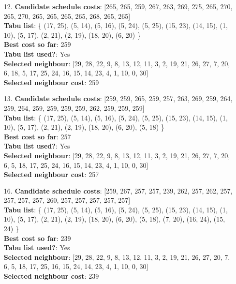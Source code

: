 \documentclass[fleqn]{article}
\begin{document}
\begin{itemize}
    \item[12.] \textbf{Candidate schedule costs}: [265, 265, 259, 267, 263, 269, 275, 265, 270, 265, 270, 265, 265, 265, 265, 268, 265, 265] \\
    \textbf{Tabu list}: \{ (17, 25), (5, 14), (5, 16), (5, 24), (5, 25), (15, 23), (14, 15), (1, 10), (5, 17), (2, 21), (2, 19), (18, 20), (6, 20) \} \\
    \textbf{Best cost so far}: 259 \\
    \textbf{Tabu list used?}: Yes \\
    \textbf{Selected neighbour}: [29, 28, 22, 9, 8, 13, 12, 11, 3, 2, 19, 21, 26, 27, 7, 20, 6, 18, 5, 17, 25, 24, 16, 15, 14, 23, 4, 1, 10, 0, 30] \\
    \textbf{Selected neighbour cost}: 259
      

    \item[13.] \textbf{Candidate schedule costs}: [259, 259, 265, 259, 257, 263, 269, 259, 264, 259, 264, 259, 259, 259, 259, 262, 259, 259, 259] \\
    \textbf{Tabu list}: \{ (17, 25), (5, 14), (5, 16), (5, 24), (5, 25), (15, 23), (14, 15), (1, 10), (5, 17), (2, 21), (2, 19), (18, 20), (6, 20), (5, 18) \} \\
    \textbf{Best cost so far}: 257 \\
    \textbf{Tabu list used?}: Yes \\
    \textbf{Selected neighbour}: [29, 28, 22, 9, 8, 13, 12, 11, 3, 2, 19, 21, 26, 27, 7, 20, 6, 5, 18, 17, 25, 24, 16, 15, 14, 23, 4, 1, 10, 0, 30] \\
    \textbf{Selected neighbour cost}: 257
      

    \item[16.] \textbf{Candidate schedule costs}: [259, 267, 257, 257, 239, 262, 257, 262, 257, 257, 257, 257, 260, 257, 257, 257, 257, 257] \\
    \textbf{Tabu list}: \{ (17, 25), (5, 14), (5, 16), (5, 24), (5, 25), (15, 23), (14, 15), (1, 10), (5, 17), (2, 21), (2, 19), (18, 20), (6, 20), (5, 18), (7, 20), (16, 24), (15, 24) \} \\
    \textbf{Best cost so far}: 239 \\
    \textbf{Tabu list used?}: Yes \\
    \textbf{Selected neighbour}: [29, 28, 22, 9, 8, 13, 12, 11, 3, 2, 19, 21, 26, 27, 20, 7, 6, 5, 18, 17, 25, 16, 15, 24, 14, 23, 4, 1, 10, 0, 30] \\
    \textbf{Selected neighbour cost}: 239
      


\end{itemize}
\end{document}
